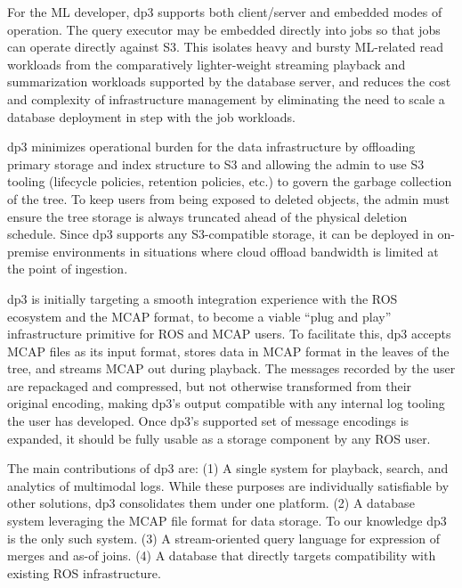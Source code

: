 \documentclass[9pt,twocolumn]{article}
\newcommand{\q}[1]{``#1''}
\begin{document}
    For the ML developer, dp3 supports both client/server and embedded modes of
    operation. The query executor may be embedded directly into jobs so that jobs
    can operate directly against S3. This isolates heavy and bursty ML-related read
    workloads from the comparatively lighter-weight streaming playback and
    summarization workloads supported by the database server, and reduces the cost
    and complexity of infrastructure management by eliminating the need to scale a
    database deployment in step with the job workloads.

    dp3 minimizes operational burden for the data infrastructure by offloading
    primary storage and index structure to S3 and allowing the admin to use S3
    tooling (lifecycle policies, retention policies, etc.) to govern the garbage
    collection of the tree. To keep users from being exposed to deleted
    objects, the admin must ensure the tree storage is always truncated ahead
    of the physical deletion schedule. Since dp3 supports any S3-compatible
    storage, it can be deployed in on-premise environments in situations where
    cloud offload bandwidth is limited at the point of ingestion.

    dp3 is initially targeting a smooth integration experience with the ROS
    \cite{Quigley09} ecosystem and the MCAP \cite{MCAP} format, to become a viable
    \q{plug and play} infrastructure primitive for ROS and MCAP users. To
    facilitate this, dp3 accepts MCAP files as its input format, stores data in
    MCAP format in the leaves of the tree, and streams MCAP out during playback.
    The messages recorded by the user are repackaged and compressed, but not
    otherwise transformed from their original encoding, making dp3’s output
    compatible with any internal log tooling the user has developed. Once dp3’s
    supported set of message encodings is expanded, it should be fully usable as a
    storage component by any ROS user.

    The main contributions of dp3 are: (1) A single system for playback,
    search, and analytics of multimodal logs. While these purposes are
    individually satisfiable by other solutions, dp3 consolidates them under
    one platform. (2) A database system leveraging the MCAP file format for
    data storage. To our knowledge dp3 is the only such system. (3) A
    stream-oriented query language for expression of merges and as-of joins.
    (4) A database that directly targets compatibility with existing ROS
    infrastructure.
\end{document}
